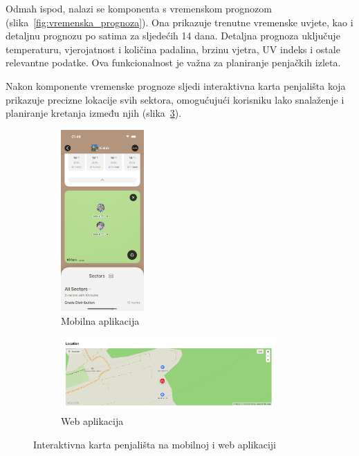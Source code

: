 Odmah ispod, nalazi se komponenta s vremenskom prognozom (slika~\ref{fig:vremenska_prognoza}). Ona prikazuje trenutne vremenske uvjete, kao i detaljnu prognozu po satima za sljedećih 14 dana. Detaljna prognoza uključuje temperaturu, vjerojatnost i količina padalina, brzinu vjetra, UV indeks i ostale relevantne podatke. Ova funkcionalnost je važna za planiranje penjačkih izleta.


Nakon komponente vremenske prognoze sljedi interaktivna karta penjališta koja prikazuje precizne lokacije svih sektora, omogućujući korisniku lako snalaženje i planiranje kretanja između njih (slika~\ref{fig:interaktivna_karta}). 

\begin{figure}[H]
    \centering
    \begin{subfigure}[b]{\textwidth}
        \centering
        \includegraphics[width=0.35\textwidth]{images/implementacija/crag-details/crag-map.png}
        \caption{Mobilna aplikacija}
        \label{fig:interaktivna_karta_mob}
    \end{subfigure}
    \hfill
    \begin{subfigure}[b]{\textwidth}
        \centering
        \includegraphics[width=0.9\textwidth]{images/implementacija/web/crag-details/crag-map.png}
        \caption{Web aplikacija}
        \label{fig:interaktivna_karta_web}
    \end{subfigure}
    \caption{Interaktivna karta penjališta na mobilnoj i web aplikaciji}
    \label{fig:interaktivna_karta}
\end{figure}

